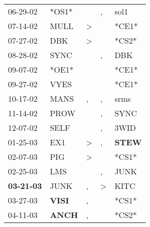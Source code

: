 \begin{supertabular}{p{0.07\textwidth}p{0.06\textwidth}p{0.02\textwidth}p{0.02\textwidth}p{0.06\textwidth}}
          06-29-02\textsuperscript{} &                            *OS1* &                  &             , &           sol1\textsuperscript{} \\
          07-14-02\textsuperscript{} &           MULL\textsuperscript{} &     \textgreater &               &                            *CE1* \\
          07-27-02\textsuperscript{} &            DBK\textsuperscript{} &     \textgreater &               &                            *CS2* \\
          08-28-02\textsuperscript{} &           SYNC\textsuperscript{} &                  &             , &            DBK\textsuperscript{} \\
          09-07-02\textsuperscript{} &                            *OE1* &                  &               &                            *CE1* \\
          09-27-02\textsuperscript{} &           VYES\textsuperscript{} &                  &               &                            *CE1* \\
          10-17-02\textsuperscript{} &           MANS\textsuperscript{} &                , &             , &           srms\textsuperscript{} \\
          11-14-02\textsuperscript{} &           PROW\textsuperscript{} &                  &             , &           SYNC\textsuperscript{} \\
          12-07-02\textsuperscript{} &           SELF\textsuperscript{} &                  &             , &           3WID\textsuperscript{} \\
          01-25-03\textsuperscript{} &            EX1\textsuperscript{} &     \textgreater &             , &  \textbf{STEW\textsuperscript{}} \\
          02-07-03\textsuperscript{} &            PIG\textsuperscript{} &     \textgreater &               &                            *CS1* \\
          02-25-03\textsuperscript{} &            LMS\textsuperscript{} &                  &             , &           JUNK\textsuperscript{} \\
 \textbf{03-21-03\textsuperscript{}} &           JUNK\textsuperscript{} &                , &  \textgreater &           KITC\textsuperscript{} \\
          03-27-03\textsuperscript{} &  \textbf{VISI\textsuperscript{}} &                , &               &                            *CS1* \\
          04-11-03\textsuperscript{} &  \textbf{ANCH\textsuperscript{}} &                , &               &                            *CS2* \\

\end{supertabular}
